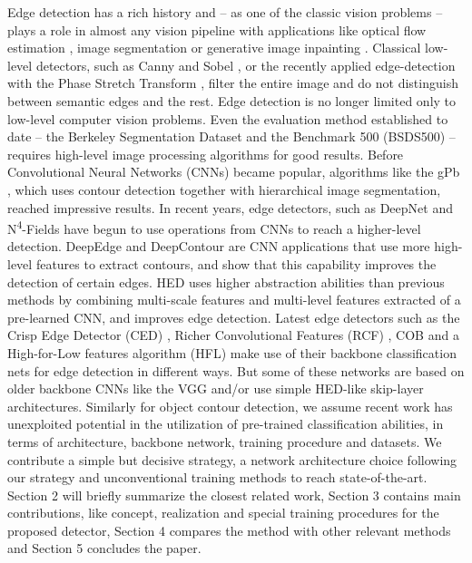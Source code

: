 \documentclass[runningheads]{llncs}
\begin{document}
Edge detection has a rich history and -- as one of the classic vision problems -- plays a role in almost any vision pipeline with applications like optical flow estimation \cite{BoundaryFlow}, image segmentation \cite{SemanticImSegmwithTaskSpecificEdgeDetection} or generative image inpainting \cite{EdgeConnect,EdgeGuided}. Classical low-level detectors, such as Canny \cite{canny1986computational} and Sobel \cite{sobel1970camera}, or the recently applied edge-detection with the Phase Stretch Transform \cite{PST}, filter the entire image and do not distinguish between semantic edges and the rest. Edge detection is no longer limited only to low-level computer vision problems. Even the evaluation method established to date -- the Berkeley Segmentation Dataset and the Benchmark 500 (BSDS500) \cite{gPb_early} -- requires high-level image processing algorithms for good results. Before Convolutional Neural Networks (CNNs) became popular, algorithms like the gPb \cite{gPb_early}, which uses contour detection together with hierarchical image segmentation, reached impressive results. In recent years, edge detectors, such as DeepNet \cite{kivinenDeepNet} and N\textsuperscript{4}-Fields \cite{Nfour} have begun to use operations from CNNs to reach a higher-level detection. DeepEdge \cite{DeepEdge} and DeepContour \cite{DeepContour} are CNN applications that use more high-level features to extract contours, and show that this capability improves the detection of certain edges. HED uses higher abstraction abilities than previous methods by combining multi-scale features and multi-level features extracted of a pre-learned CNN, and improves edge detection. Latest edge detectors such as the Crisp Edge Detector (CED) \cite{CED}, Richer Convolutional Features (RCF) \cite{RCF}, COB and a High-for-Low features algorithm (HFL) \cite{HFL} make use of their backbone classification nets for edge detection in different ways. But some of these networks are based on older backbone CNNs like the VGG and/or use simple HED-like skip-layer architectures. Similarly for object contour detection, we assume recent work has unexploited potential in the utilization of pre-trained classification abilities, in terms of architecture, backbone network, training procedure and datasets. We contribute a simple but decisive strategy, a network architecture choice following our strategy and unconventional training methods to reach state-of-the-art.
\\
Section 2 will briefly summarize the closest related work, Section 3 contains main contributions, like concept, realization and special training procedures for the proposed detector, Section 4 compares the method with other relevant methods and Section 5 concludes the paper.
\end{document}
